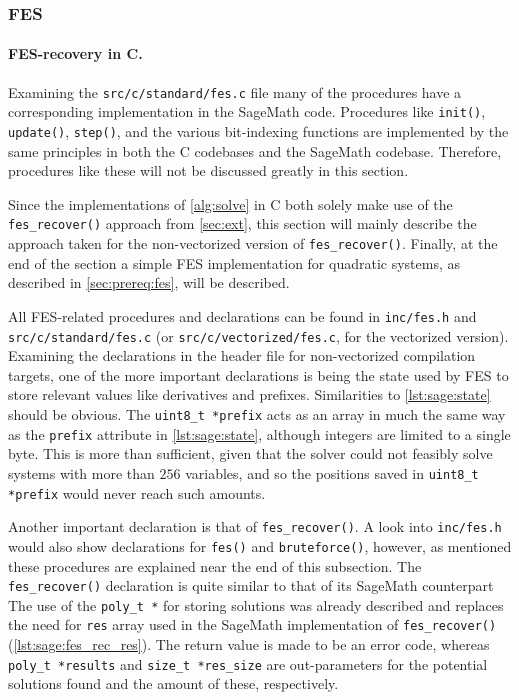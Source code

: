 \subsubsection{FES} \label{sec:impl:c:fes}
\paragraph{FES-recovery in C.} Examining the \texttt{src/c/standard/fes.c} file many of the procedures have a corresponding implementation in the SageMath code. Procedures like \texttt{init()}, \texttt{update()}, \texttt{step()}, and the various bit-indexing functions are implemented by the same principles in both the C codebases and the SageMath codebase. Therefore, procedures like these will not be discussed greatly in this section.

Since the implementations of \cref{alg:solve} in C both solely make use of the \texttt{fes\_recover()} approach from \cref{sec:ext}, this section will mainly describe the approach taken for the non-vectorized version of \texttt{fes\_recover()}. Finally, at the end of the section a simple FES implementation for quadratic systems, as described in \cref{sec:prereq:fes}, will be described.

All FES-related procedures and declarations can be found in \texttt{inc/fes.h} and \texttt{src/c/standard/fes.c} (or \texttt{src/c/vectorized/fes.c}, for the vectorized version). Examining the declarations in the header file for non-vectorized compilation targets, one of the more important declarations is
being the state used by FES to store relevant values like derivatives and prefixes. Similarities to \cref{lst:sage:state} should be obvious. The \texttt{uint8\_t *prefix} acts as an array in much the same way as the \texttt{prefix} attribute in \cref{lst:sage:state}, although integers are limited to a single byte. This is more than sufficient, given that the solver could not feasibly solve systems with more than $256$ variables, and so the positions saved in \texttt{uint8\_t *prefix} would never reach such amounts.

Another important declaration is that of \texttt{fes\_recover()}. A look into \texttt{inc/fes.h} would also show declarations for \texttt{fes()} and \texttt{bruteforce()}, however, as mentioned these procedures are explained near the end of this subsection. The \texttt{fes\_recover()} declaration is quite similar to that of its SageMath counterpart
The use of the \texttt{poly\_t *} for storing solutions was already described and replaces the need for \texttt{res} array used in the SageMath implementation of \texttt{fes\_recover()} (\cref{lst:sage:fes_rec_res}). The return value is made to be an error code, whereas \texttt{poly\_t *results} and \texttt{size\_t *res\_size} are out-parameters for the potential solutions found and the amount of these, respectively.

